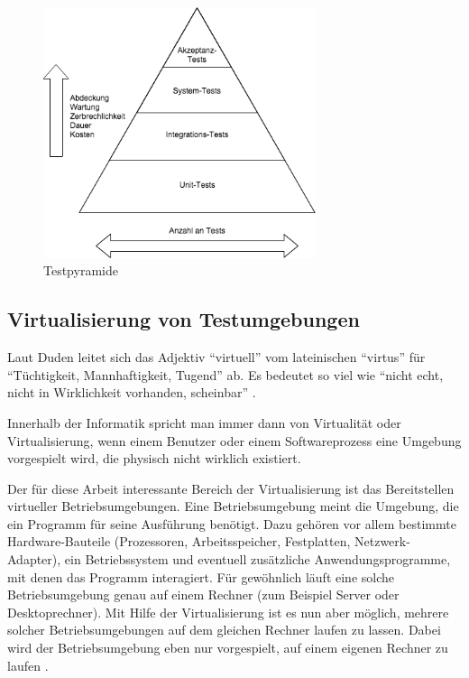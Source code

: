 \begin{figure}[!ht]
  \begin{center}
    \includegraphics[width=8cm]{bilder/testpyramide.png}
    \caption{Testpyramide \citep[Vgl.][]{testpyramide}}
  \end{center}
\end{figure}



\subsection{Virtualisierung von Testumgebungen}

Laut Duden leitet sich das Adjektiv "`virtuell"' vom lateinischen "`virtus"' für "`Tüchtigkeit, Mannhaftigkeit, Tugend"' ab. Es bedeutet so viel wie "`nicht echt, nicht in Wirklichkeit vorhanden, scheinbar"' \citep[Vgl.][]{duden:001}.

Innerhalb der Informatik spricht man immer dann von Virtualität oder Virtualisierung, wenn einem Benutzer oder einem Softwareprozess eine Umgebung vorgespielt wird, die physisch nicht wirklich existiert.

Der für diese Arbeit interessante Bereich der Virtualisierung ist das Bereitstellen virtueller Betriebsumgebungen. Eine Betriebsumgebung meint die Umgebung, die ein Programm für seine Ausführung benötigt. Dazu gehören vor allem bestimmte Hardware-Bauteile (Prozessoren, Arbeitsspeicher, Festplatten, Netzwerk-Adapter), ein Betriebssystem und eventuell zusätzliche Anwendungsprogramme, mit denen das Programm interagiert. Für gewöhnlich läuft eine solche Betriebsumgebung genau auf einem Rechner (zum Beispiel Server oder Desktoprechner). Mit Hilfe der Virtualisierung ist es nun aber möglich, mehrere solcher Betriebsumgebungen auf dem gleichen Rechner laufen zu lassen. Dabei wird der Betriebsumgebung eben nur vorgespielt, auf einem eigenen Rechner zu laufen \citep[Vgl.][Abstract]{DamMohAnd12}.

